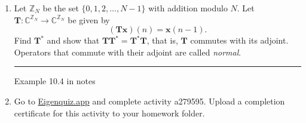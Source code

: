 \documentclass[12pt]{amsart}
\newcommand{\1}{\mathbbm{1}}
\numberwithin{equation}{section}
\numberwithin{Theorem}{section}
\theoremstyle{plain} %
\theoremstyle{definition}
\theoremstyle{remark}
\begin{document}
\begin{enumerate}[1.]


\item Let \(\mathbb{Z}_{N}\) be the set \(\{0,1,2,\ldots,N-1\}\) with addition modulo \(N\). Let \(\mathbf{T}:\mathbb{C}^{\mathbb{Z}_{N}}\to\mathbb{C}^{\mathbb{Z}_{N}}\) be given by \[(\mathbf{Tx})(n) = \mathbf{x}(n-1).\]
Find \(\mathbf{T}^{\ast}\) and show that \(\mathbf{TT}^{\ast}=\mathbf{T}^{\ast}\mathbf{T}\), that is, \(\mathbf{T}\) commutes with its adjoint. Operators that commute with their adjoint are called \textit{normal}.\bigskip

\hrule
\bigskip

Example 10.4 in notes



\vspace{\fill}

\item Go to \href{https://eigenquiz.app/}{Eigenquiz.app} and complete activity a279595. Upload a completion certificate for this activity to your homework folder.

\end{enumerate}
\end{document}
